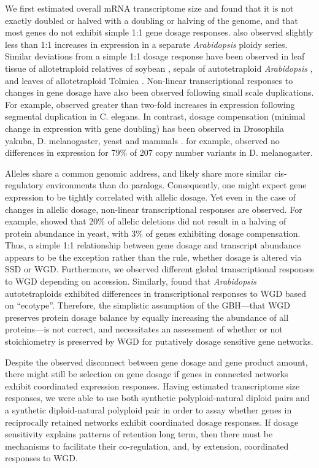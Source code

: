 \documentclass[11pt]{article}
\begin{document}
We first estimated overall mRNA transcriptome size and found that it is not exactly doubled or halved with a doubling or halving of the genome, and that most genes do not exhibit simple 1:1 gene dosage responses. \cite{hou2018} also observed slightly less than 1:1 increases in expression in a separate {\it Arabidopsis} ploidy series. Similar deviations from a simple 1:1 dosage response have been observed in leaf tissue of allotetraploid relatives of soybean \citep{coate2010}, sepals of autotetraploid {\it Arabidopsis} \citep{robinson2018}, and leaves of allotetraploid Tolmiea \citep{visger2019}.
Non-linear transcriptional responses to changes in gene dosage have also been observed following small scale duplications. For example, \cite{konrad2018} observed greater than two-fold increases in expression following segmental duplication in C. elegans. In contrast, dosage compensation (minimal change in expression with gene doubling) has been observed in Drosophila yakuba, D. melanogaster, yeast and mammals \citep{qian2010, rogers2017, zhou2011}. \cite{zhou2011} for example, observed no differences in expression for 79\% of 207 copy number variants in D. melanogaster.

Alleles share a common genomic address, and likely share more similar cis-regulatory environments than do paralogs. Consequently, one might expect gene expression to be tightly correlated with allelic dosage. Yet even in the case of changes in allelic dosage, non-linear transcriptional responses are observed. For example, \cite{springer2010} showed that 20\% of allelic deletions did not result in a halving of protein abundance in yeast, with 3\% of genes exhibiting dosage compensation. Thus, a simple 1:1 relationship between gene dosage and transcript abundance appears to be the exception rather than the rule, whether dosage is altered via SSD or WGD. Furthermore, we observed different global transcriptional responses to WGD depending on accession. Similarly, \cite{yu2010} found that {\it Arabidopsis} autotetraploids exhibited differences in transcriptional responses to WGD based on ``ecotype''. Therefore, the simplistic assumption of the GBH---that WGD preserves protein dosage balance by equally increasing the abundance of all proteins---is not correct, and necessitates an assessment of whether or not stoichiometry is preserved by WGD for putatively dosage sensitive gene networks.

Despite the observed disconnect between gene dosage and gene product amount, there might still be selection on gene dosage if genes in connected networks exhibit coordinated expression responses. Having estimated transcriptome size responses, we were able to use both synthetic polyploid-natural diploid pairs and a synthetic diploid-natural polyploid pair in order to assay whether genes in reciprocally retained networks exhibit coordinated dosage responses. If dosage sensitivity explains patterns of retention long term, then there must be mechanisms to facilitate their co-regulation\citep{papp2003}, and, by extension, coordinated responses to WGD.
\end{document}
